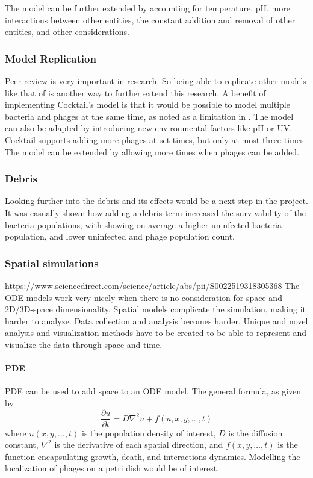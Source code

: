 The model can be further extended by accounting for temperature, pH, more interactions between other entities, the constant addition and removal of other entities, and other considerations. 

\subsubsection{Model Replication}
Peer review is very important in research. 
So being able to replicate other models like that of \citet{nilssonCocktailComputerProgram2022} is another way to further extend this research. 
A benefit of implementing Cocktail's model is that it would be possible to model multiple bacteria and phages at the same time, as noted as a limitation in . 
The model can also be adapted by introducing new environmental factors like pH or UV. 
Cocktail supports adding more phages at set times, but only at most three times. 
The model can be extended by allowing more times when phages can be added. 

\subsubsection{Debris}
Looking further into the debris and its effects would be a next step in the project. 
It was casually shown how adding a debris term increased the survivability of the bacteria populations, with showing on average a higher uninfected bacteria population, and lower uninfected and phage population count. 


\subsubsection{Spatial simulations}
https://www.sciencedirect.com/science/article/abs/pii/S0022519318305368
The ODE models work very nicely when there is no consideration for space and 2D/3D-space dimensionality. 
Spatial models complicate the simulation, making it harder to analyze. 
Data collection and analysis becomes harder. 
Unique and novel analysis and visualization methods have to be created to be able to represent and visualize the data through space and time. 
\paragraph{PDE}
PDE can be used to add space to an ODE model. 
The general formula, as given by 
\[
    \frac{\partial u}{\partial t} = D\nabla^2u + f(u, x, y, \dots, t)
\] where $u(x, y, \dots, t)$ is the population density of interest, $D$ is the diffusion constant, $\nabla^2$ is the derivative of each spatial direction, and $f(x, y, \dots, t)$ is the function encapsulating growth, death, and interactions dynamics. 
Modelling the localization of phages on a petri dish would be of interest. 


